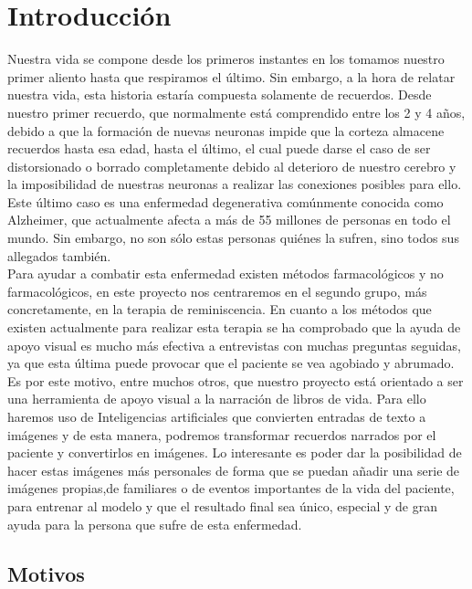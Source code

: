 \chapter{Introducción}
\label{cap:introduccion}


Nuestra vida se compone desde los primeros instantes en los tomamos nuestro primer aliento hasta que respiramos el último. Sin embargo, a la hora de relatar nuestra vida, esta historia estaría compuesta solamente de recuerdos. Desde nuestro primer recuerdo, que normalmente está comprendido entre los 2 y 4 años, debido a que la formación de nuevas neuronas impide que la corteza almacene recuerdos hasta esa edad, hasta el último, el cual puede darse el caso de ser distorsionado o borrado completamente debido al deterioro de nuestro cerebro y la imposibilidad de nuestras neuronas a realizar las conexiones posibles para ello. Este último caso es una enfermedad degenerativa comúnmente conocida como Alzheimer, que actualmente afecta a más de 55 millones de personas en todo el mundo. Sin embargo, no son sólo estas personas quiénes la sufren, sino todos sus allegados también. \\


Para ayudar a combatir esta enfermedad existen métodos farmacológicos y no farmacológicos, en este proyecto nos centraremos en el segundo grupo, más concretamente, en la terapia de reminiscencia. En cuanto a los métodos que existen actualmente para realizar esta terapia se ha comprobado que la ayuda de apoyo visual es mucho más efectiva a entrevistas con muchas preguntas seguidas, ya que esta última puede provocar que el paciente se vea agobiado y abrumado. Es por este motivo, entre muchos otros, que nuestro proyecto está orientado a ser una herramienta de apoyo visual a la narración de libros de vida. Para ello haremos uso de Inteligencias artificiales que convierten entradas de texto a imágenes y de esta manera, podremos transformar recuerdos narrados por el paciente y convertirlos en imágenes. Lo interesante es poder dar la posibilidad de hacer estas imágenes más personales de forma que se puedan añadir una serie de imágenes propias,de familiares o de eventos importantes de la vida del paciente, para entrenar al modelo y que el resultado final sea único, especial y de gran ayuda para la persona que sufre de esta enfermedad. 

\section{Motivos}

